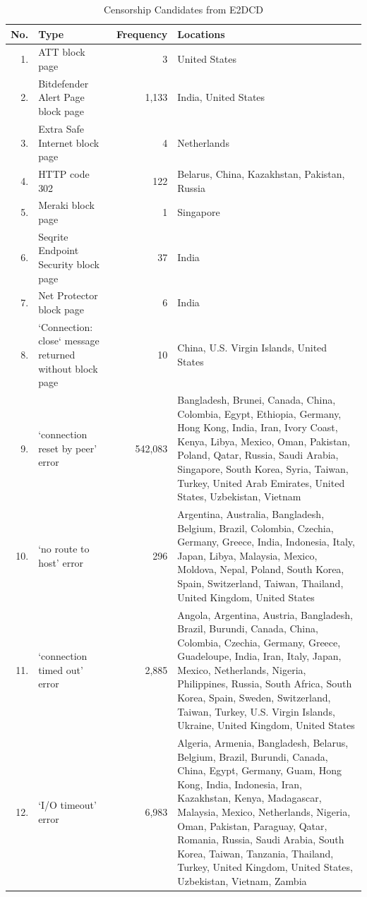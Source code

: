 \begin{table}
	\centering
  \caption{Censorship Candidates from E2DCD}
  \label{tab:ae_results}
	{\footnotesize
  \begin{tabular}{r p{} r p{}}
    \toprule
		No. & Type & Frequency & Locations\\
    \midrule
		1. & ATT block page & 3 & United States \\
		2. & Bitdefender Alert Page block page & 1,133 & India, United States \\
		3. & Extra Safe Internet block page & 4 & Netherlands \\
		4. & HTTP code 302 & 122 & Belarus, China, Kazakhstan, Pakistan, Russia \\
		5. & Meraki block page & 1 & Singapore \\
		6. & Seqrite Endpoint Security block page & 37 & India \\
		7. & Net Protector block page & 6 & India \\
		8. & `Connection: close` message returned without block page & 10 & China, U.S. Virgin Islands, United States \\
		9. & `connection reset by peer' error & 542,083 & Bangladesh, Brunei, Canada, China, Colombia, Egypt, Ethiopia, Germany, Hong Kong, India, Iran, Ivory Coast, Kenya, Libya, Mexico, Oman, Pakistan, Poland, Qatar, Russia, Saudi Arabia, Singapore, South Korea, Syria, Taiwan, Turkey, United Arab Emirates, United States, Uzbekistan, Vietnam \\
		10. & `no route to host' error & 296 & Argentina, Australia, Bangladesh, Belgium, Brazil, Colombia, Czechia, Germany, Greece, India, Indonesia, Italy, Japan, Libya, Malaysia, Mexico, Moldova, Nepal, Poland, South Korea, Spain, Switzerland, Taiwan, Thailand, United Kingdom, United States \\
		11. & `connection timed out' error & 2,885 & Angola, Argentina, Austria, Bangladesh, Brazil, Burundi, Canada, China, Colombia, Czechia, Germany, Greece, Guadeloupe, India, Iran, Italy, Japan, Mexico, Netherlands, Nigeria, Philippines, Russia, South Africa, South Korea, Spain, Sweden, Switzerland, Taiwan, Turkey, U.S. Virgin Islands, Ukraine, United Kingdom, United States \\
		12. & `I/O timeout' error & 6,983 & Algeria, Armenia, Bangladesh, Belarus, Belgium, Brazil, Burundi, Canada, China, Egypt, Germany, Guam, Hong Kong, India, Indonesia, Iran, Kazakhstan, Kenya, Madagascar, Malaysia, Mexico, Netherlands, Nigeria, Oman, Pakistan, Paraguay, Qatar, Romania, Russia, Saudi Arabia, South Korea, Taiwan, Tanzania, Thailand, Turkey, United Kingdom, United States, Uzbekistan, Vietnam, Zambia \\

\end{tabular}}
\end{table}
